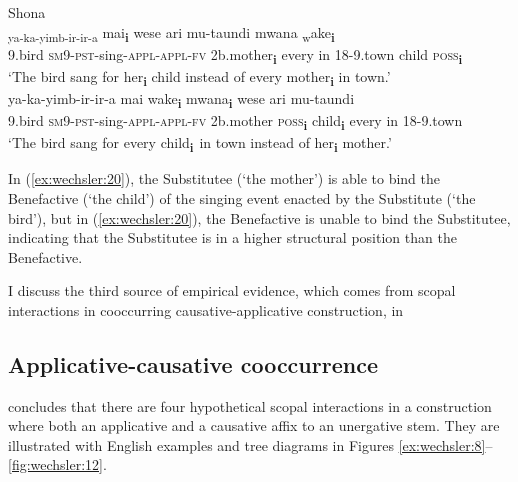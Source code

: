 \documentclass[output=paper,modfonts,nonflat]{langsci/langscibook}
\begin{document}
\ea\label{ex:wechsler:20}
Shona\\
\ea
{} {\textsubscript{ya-ka-yimb-ir-ir-a} } {mai}\textbf{{\textsubscript{i}}} {wese} {ari}  {{mu-taundi}}  {{mwana}} {\textsubscript{w}}{ake}\textbf{{\textsubscript{i}}}\\
 9.bird  \textsc{sm}9-\textsc{pst}{}-sing-\textsc{appl-appl-fv}  2b.mother\textbf{\textsubscript{i}}  every  in  {18-9.town}  {child}  \textsc{poss}\textbf{\textsubscript{i}}\\
\glt `The bird sang for her\textbf{\textsubscript{i}} child instead of every mother\textbf{\textsubscript{i}} in town.’   \\

\ex
{} {ya-ka-yimb-ir-ir-a} {mai} {wake\textbf{\textsubscript{i}}}  {{mwana\textbf{\textsubscript{i}}}}  {{wese}} {ari}  {{mu-taundi}}\\
 9.bird  \textsc{sm}9-\textsc{pst}{}-sing-\textsc{appl-appl-fv}  2b.mother  \textsc{poss}\textbf{\textsubscript{i}}  {child\textbf{\textsubscript{i}}}  {every}  in  {18-9.town}\\
\glt `The bird sang for every child\textbf{\textsubscript{i}}\textsubscript{~}in town instead of her\textbf{\textsubscript{i}} mother.'
\z
\z

In (\ref{ex:wechsler:20}), the Substitutee (‘the mother’) is able to bind the Benefactive (‘the child’) of the singing event enacted by the Substitute (‘the bird’), but in (\ref{ex:wechsler:20}), the Benefactive is unable to bind the Substitutee, indicating that the Substitutee is in a higher structural position than the Benefactive. 



I discuss the third source of empirical evidence, which comes from scopal interactions in cooccurring causative-applicative construction, in 

\subsection{Applicative-causative cooccurrence}\label{sec:wechsler:3.4}

\citet{Wechsler2016} concludes that there are four hypothetical scopal interactions in a construction where both an applicative and a causative affix to an unergative stem. They are illustrated with English examples and tree diagrams in Figures \ref{ex:wechsler:8}--\ref{fig:wechsler:12}. 
 
\end{document}
